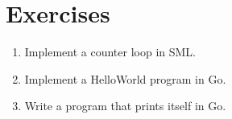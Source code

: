 \section{Exercises}

\begin{enumerate}

\item Implement a counter loop in SML.

\item Implement a HelloWorld program in Go.

\item Write a program that prints itself in Go.

\end{enumerate}
